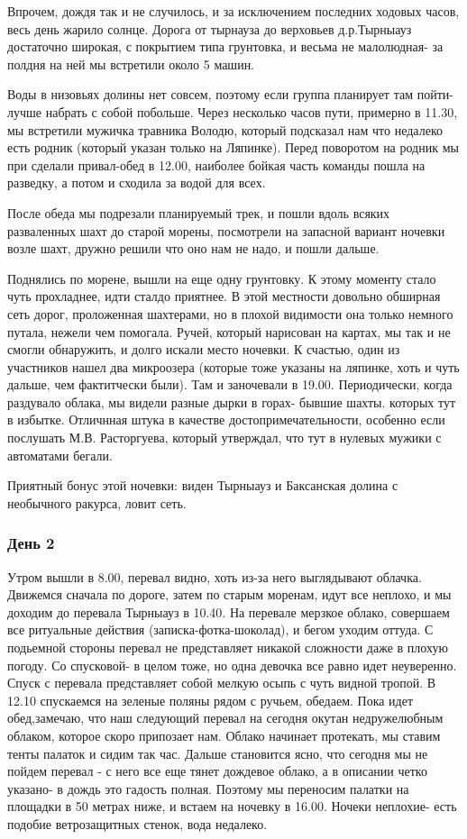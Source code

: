 \documentclass[]{article}
\newcommand{\tyr}{Тырныауз }
\begin{document}
Впрочем, дождя так и не случилось, и за исключением последних ходовых часов, весь день жарило солнце. 
Дорога от тырнауза до верховьев д.р.Тырныауз достаточно широкая, с покрытием типа грунтовка, и весьма не малолюдная- за полдня на ней мы встретили около 5 машин.

Воды в низовьях долины нет совсем, поэтому если группа планирует там пойти- лучше набрать с собой побольше. Через несколько часов пути, примерно в 11.30, мы встретили мужичка травника Володю, который подсказал нам что недалеко есть родник (который указан только на Ляпинке). Перед поворотом на родник мы при сделали привал-обед в 12.00, наиболее бойкая часть команды пошла на разведку, а потом и сходила за водой для всех. 

После обеда мы подрезали планируемый трек, и пошли вдоль всяких разваленных шахт до старой морены, посмотрели на запасной вариант ночевки возле шахт, дружно решили что оно нам не надо, и пошли дальше.

Поднялись по морене, вышли на еще одну грунтовку.
К этому моменту стало чуть прохладнее, идти сталдо приятнее. В этой местности довольно обширная сеть дорог, проложенная шахтерами, но в плохой видимости она только немного путала, нежели чем помогала.
Ручей, который нарисован на картах, мы так и не смогли обнаружить, и долго искали место ночевки. К счастью, один из участников нашел два микроозера (которые тоже указаны на ляпинке, хоть и чуть дальше, чем фактитчески были). Там и заночевали в 19.00. Периодически, когда раздувало облака, мы видели разные дырки в горах- бывшие шахты. которых тут в избытке. Отличнная штука в качестве достопримечательности, особенно если послушать М.В. Расторгуева, который утверждал, что тут в нулевых мужики с автоматами бегали. 

Приятный бонус этой ночевки: виден \tyr и Баксанская долина с необычного ракурса, ловит сеть.

\subsubsection{День 2}
Утром вышли в 8.00, перевал видно, хоть из-за него выглядывают облачка. Движемся сначала по дороге, затем по старым моренам, идут все неплохо, и мы доходим до перевала \tyr в 10.40. На перевале мерзкое облако, совершаем все ритуальные действия (записка-фотка-шоколад), и бегом уходим оттуда. С подьемной стороны перевал не представляет никакой сложности даже в плохую погоду. Со спусковой- в целом тоже, но одна девочка все равно идет  неуверенно.
Спуск с перевала представляет собой мелкую осыпь с чуть видной тропой. В 12.10 спускаемся на зеленые поляны рядом с ручьем, обедаем. Пока идет обед,замечаю, что наш следующий перевал на сегодня окутан недружелюбным облаком, которое скоро припозает нам. Облако начинает протекать, мы ставим тенты палаток и сидим так час. Дальше становится ясно, что сегодня мы не пойдем перевал - с него все еще тянет дождевое облако, а в описании четко указано- в дождь это гадость полная. Поэтому мы переносим палатки на площадки в 50 метрах ниже, и встаем на ночевку в 16.00. Ночеки неплохие- есть подобие ветрозащитных стенок, вода недалеко.
\end{document}
